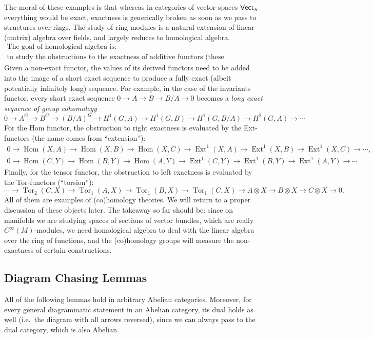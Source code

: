 \documentclass[english,letterpaper]{article}%
\numberwithin{equation}{section}
\numberwithin{figure}{section}
\numberwithin{table}{section}
\theoremstyle{definition}
\theoremstyle{definition}
\theoremstyle{definition}
\theoremstyle{plain}
\theoremstyle{plain}
\theoremstyle{plain}
\theoremstyle{plain}
\theoremstyle{remark}
\theoremstyle{remark}
\DeclareMathOperator{\Hom}{Hom}
\DeclareMathOperator{\Ext}{Ext}
\DeclareMathOperator{\Tor}{Tor}
\begin{document}
The moral of these examples is that whereas in categories of vector spaces $\mathsf{Vect}_K$ everything would be exact, exactness is generically broken as soon as we pass to structures over rings. The study of ring modules is a natural extension of linear (matrix) algebra over fields, and largely reduces to homological algebra.
\[
\boxed{\begin{array}{c}
\text{The goal of homological algebra is:}\\
\text{to study the obstructions to the exactness of additive functors (these obstructions are called derived functors).}
\end{array}}
\]
Given a non-exact functor, the values of its derived functors need to be added into the image of a short exact sequence to produce a fully exact (albeit potentially infinitely long) sequence. For example, in the case of the invariants functor, every short exact sequence $0\to A\to B\to B/A\to 0$ becomes a \emph{long exact sequence of group cohomology}
\[0\to A^G\to B^G\to (B/A)^G\to H^1(G,A)\to H^1(G,B)\to H^1(G,B/A)\to H^2(G,A)\to\cdots\]
For the Hom functor, the obstruction to right exactness is evaluated by the Ext-functors (the name comes from ``extension''):
\begin{gather}
    0\to \Hom(X,A)\to \Hom(X,B)\to\Hom(X,C)\to \Ext^1(X,A)\to \Ext^1(X,B)\to\Ext^1(X,C)\to\cdots,\\
    0\to \Hom(C,Y)\to \Hom(B,Y)\to\Hom(A,Y)\to \Ext^1(C,Y)\to \Ext^1(B,Y)\to\Ext^1(A,Y)\to\cdots
\end{gather}
Finally, for the tensor functor, the obstruction to left exactness is evaluated by the Tor-functors (``torsion''):
\[\cdots\to \Tor_2(C,X)\to \Tor_1(A,X)\to \Tor_1(B,X)\to\Tor_1(C,X)\to A\otimes X\to B\otimes X\to C\otimes X\to 0.\]
All of them are examples of (co)homology theories. We will return to a proper discussion of these objects later. The takeaway so far should be: since on manifolds we are studying spaces of sections of vector bundles, which are really $C^\infty(M)$-modules, we need homological algebra to deal with the linear algebra over the ring of functions, and the (co)homology groups will measure the non-exactness of certain constructions.




\subsection{Diagram Chasing Lemmas}

All of the following lemmas hold in arbitrary Abelian categories. Moreover, for every general diagrammatic statement in an Abelian category, its dual holds as well (i.e.\ the diagram with all arrows reversed), since we can always pass to the dual category, which is also Abelian.
\end{document}

